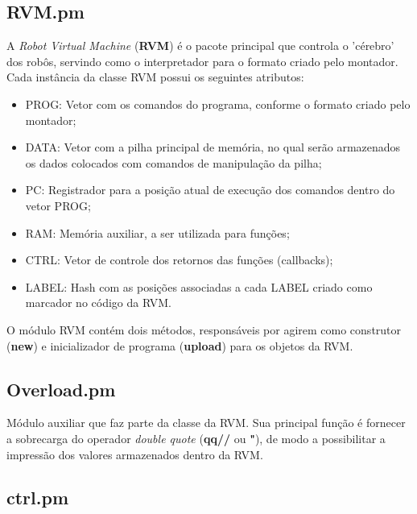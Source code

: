 \documentclass[a4paper]{article}
\begin{document}
    \subsection{RVM.pm}
        
        A \emph{Robot Virtual Machine} (\textbf{RVM}) é o pacote 
        principal que controla o 'cérebro' dos robôs, servindo como o
        interpretador para o formato criado pelo montador. Cada 
        instância da classe RVM possui os seguintes atributos:
        
        \begin{itemize}
            
            \item PROG:  Vetor com os comandos do programa, conforme
                         o formato criado pelo montador;
            \item DATA:  Vetor com a pilha principal de memória, no 
                         qual serão armazenados os dados colocados 
                         com comandos de manipulação da pilha;
            \item PC:    Registrador para a posição atual de execução 
                         dos comandos dentro do vetor PROG;
            \item RAM:   Memória auxiliar, a ser utilizada para funções;
            \item CTRL:  Vetor de controle dos retornos das funções 
                         (callbacks);
            \item LABEL: Hash com as posições associadas a cada LABEL
                         criado como marcador no código da RVM.
        \end{itemize}
        
        O módulo RVM contém dois métodos, responsáveis por agirem como
        construtor (\textbf{new}) e inicializador de programa 
        (\textbf{upload}) para os objetos da RVM.
        
    \subsection{Overload.pm}
        
        Módulo auxiliar que faz parte da classe da RVM. Sua principal
        função é fornecer a sobrecarga do operador \emph{double quote}
        (\textbf{qq//} ou \textbf{"}), de modo a possibilitar a 
        impressão dos valores armazenados dentro da RVM.
    
    \subsection{ctrl.pm}
    
\end{document}
